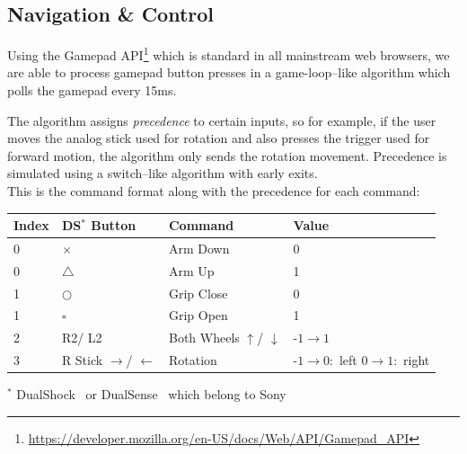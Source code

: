\documentclass[a4paper,12pt]{article}
\newcommand{\sz}{\text{-}}
\begin{document}
\subsection{Navigation \& Control} \label{navcmd}

Using the Gamepad API\footnote{\url{https://developer.mozilla.org/en-US/docs/Web/API/Gamepad_API}} which is standard in all mainstream web browsers, we are able to process gamepad button presses in a game-loop--like algorithm which polls the gamepad every 15ms.

The algorithm assigns \textit{precedence} to certain inputs, so for example, if the user moves the analog stick used for rotation and also presses the trigger used for forward motion, the algorithm only sends the rotation movement. Precedence is simulated using a switch--like algorithm with early exits.\\
This is the command format along with the precedence for each command:
\begin{center}
    \bgroup
    \def\arraystretch{1.5}
    {
        \begin{tabular}{|l|l|l|p{6em}|}
            \hline
            \textbf{Index} & \textbf{DS$^*$ Button}              & \textbf{Command}                     & \textbf{Value}                                                \\
            \hline
            0              & $\times$                            & Arm Down                             & 0                                                             \\
            \hline
            0              & $\triangle$                         & Arm Up                               & 1                                                             \\
            \hline
            1              & $\bigcirc$                          & Grip Close                           & 0                                                             \\
            \hline
            1              & $\square$                           & Grip Open                            & 1                                                             \\
            \hline
            2              & R2/ L2                              & Both Wheels $\uparrow$/ $\downarrow$ & $\sz1 \rightarrow 1$                                          \\
            \hline
            3              & R Stick $\rightarrow$/ $\leftarrow$ & Rotation                             & $\sz1 \rightarrow 0 :$ left \newline $0 \rightarrow 1:$ right \\
            \hline
        \end{tabular}}
    \egroup

    \footnotesize{$^*$ DualShock \textregistered\ or DualSense \textregistered\ which belong to Sony \texttrademark}\\
\end{center}
\end{document}
